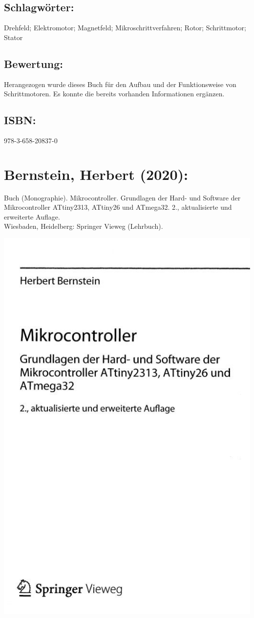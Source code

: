 \subsection*{Schlagwörter:}
Drehfeld; Elektromotor; Magnetfeld; Mikroschrittverfahren; Rotor; Schrittmotor; Stator
\subsection*{Bewertung:}
Herangezogen wurde dieses Buch für den Aufbau und der Funktionsweise von Schrittmotoren. Es konnte die bereits vorhanden Informationen ergänzen.
\subsection*{ISBN:}
978-3-658-20837-0

\section*{Bernstein, Herbert (2020):}
Buch (Monographie). Mikrocontroller. Grundlagen der Hard- und Software der Mikrocontroller ATtiny2313, ATtiny26 und ATmega32.
2., aktualisierte und erweiterte Auflage.\\Wiesbaden, Heidelberg: Springer Vieweg (Lehrbuch). \\
\begin{minipage}{0.5\textwidth}
	\includegraphics[width=\linewidth]{../Appendix/Literaturverzeichnis/img/Bernstein2.jpg}
\end{minipage}
